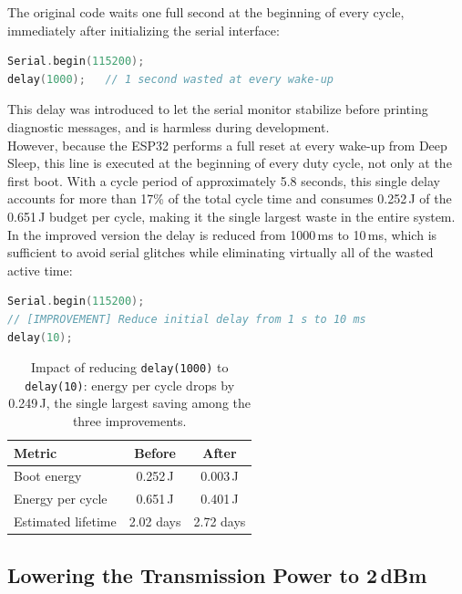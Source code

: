 \documentclass[a4paper,11pt]{article}
\begin{document}
The original code waits one full second at the beginning of every cycle, immediately after initializing the serial interface:

\begin{lstlisting}[language=C++]
Serial.begin(115200);
delay(1000);   // 1 second wasted at every wake-up
\end{lstlisting}

This delay was introduced to let the serial monitor stabilize before printing
diagnostic messages, and is harmless during development.\\

However, because the ESP32 performs a full reset at every wake-up from Deep Sleep, this line is executed at the beginning of every duty cycle, not only at the first boot. With a cycle period of approximately 5.8 seconds, this single delay accounts for more than 17\% of the total cycle time and consumes 0.252\,J of the 0.651\,J budget per cycle, making it the single largest waste in the entire system.\\

In the improved version the delay is reduced from 1000\,ms to 10\,ms, which is
sufficient to avoid serial glitches while eliminating virtually all of the wasted
active time:

\begin{lstlisting}[language=C++]
Serial.begin(115200);
// [IMPROVEMENT] Reduce initial delay from 1 s to 10 ms
delay(10);
\end{lstlisting}

\begin{table}[H]
\centering
\begin{tabular}{lcc}
\toprule
\textbf{Metric} & \textbf{Before} & \textbf{After} \\
\midrule
Boot energy        & 0.252\,J  & 0.003\,J \\
Energy per cycle   & 0.651\,J  & 0.401\,J \\
Estimated lifetime & 2.02 days & 2.72 days \\
\bottomrule
\end{tabular}
\caption{Impact of reducing \texttt{delay(1000)} to \texttt{delay(10)}: energy per cycle drops by 0.249\,J, the single largest saving among the three improvements.}
\end{table}

\subsection{Lowering the Transmission Power to 2\,dBm}
\end{document}
